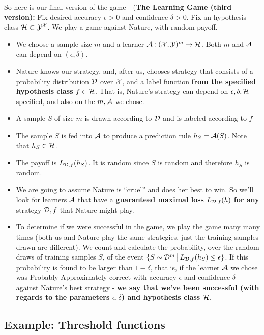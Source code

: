  So here is our final version of the game - ({\bf The Learning Game (third
   version):} Fix desired accuracy $\epsilon>0$ and confidence $\delta>0$. Fix
   an hypothesis class $\mathcal{H} \subset \mathcal{Y}^{\mathcal{X}}$. 
 We play a game against Nature, with random payoff.
  \begin{itemize}
    \item We choose a sample size $m$ and a learner $\mathcal{A}:(\mathcal{X},\mathcal{Y})^m \to \mathcal{H}$. 
    Both $m$ and $\mathcal{A}$ can depend on $(\epsilon,\delta)$.
       \item Nature knows our strategy, and, after us, chooses strategy that consists of a probability distribution $\mathcal{D}$ over $\mathcal{X}$, and a label function {\bf from the specified hypothesis class} $f\in\mathcal{H}$. 
     That is, Nature's strategy can depend on $\epsilon,\delta,\mathcal{H}$ specified, and also on the $m,\mathcal{A}$ we chose. 
    \item A sample $S$ of size $m$ is drawn according to $\mathcal{D}$ and is labeled
      according to $f$
    \item The sample $S$ is fed into $\mathcal{A}$ to produce a prediction rule
      $h_S=\mathcal{A}(S)$. Note that $h_S\in\mathcal{H}$.
    \item The payoff is $L_{\mathcal{D},f}(h_S)$. It is random since $S$ is random and
      therefore $h_S$ is random.
    \item We are going to assume Nature is ``cruel'' and does her best to win.
      So we'll look for learners $\mathcal{A}$ that have a {\bf guaranteed maximal 
      loss} $L_{\mathcal{D},f}(h)$ {\bf for any} strategy $\mathcal{D},f$ that Nature might play.
      \item To determine if we were successful in the game, we play the game many many times 
      (both us and Nature play the same strategies, just the training samples drawn are different).
      We count and calculate the probability, over the random draws of training samples $S$, of the event
      $\{ S \sim \mathcal{D}^m \,\big |\,L_{\mathcal{D},f}(h_S)\leq \epsilon \}$. If this probability is found to be 
      larger than $1-\delta$, that is, if 
      the learner $\mathcal{A}$ we chose was Probably Approximately correct with accuracy $\epsilon$ and confidence $\delta$ - against Nature's best strategy - {\bf we say that we've been successful (with regards to the parameters $\epsilon,\delta$) and hypothesis class $\mathcal{H}$}.
\end{itemize}


\subsection{Example: Threshold functions}

